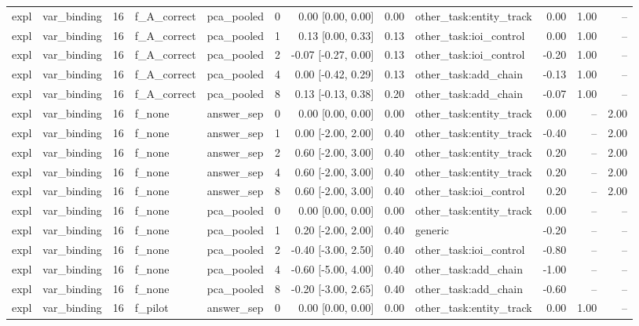 \begin{tabular}{llrllrrrlrrr}
expl & var\_binding & 16 & f\_A\_correct & pca\_pooled & 0 & 0.00 [0.00, 0.00] & 0.00 & other\_task:entity\_track & 0.00 & 1.00 & -- \\
expl & var\_binding & 16 & f\_A\_correct & pca\_pooled & 1 & 0.13 [0.00, 0.33] & 0.13 & other\_task:ioi\_control & 0.00 & 1.00 & -- \\
expl & var\_binding & 16 & f\_A\_correct & pca\_pooled & 2 & -0.07 [-0.27, 0.00] & 0.13 & other\_task:ioi\_control & -0.20 & 1.00 & -- \\
expl & var\_binding & 16 & f\_A\_correct & pca\_pooled & 4 & 0.00 [-0.42, 0.29] & 0.13 & other\_task:add\_chain & -0.13 & 1.00 & -- \\
expl & var\_binding & 16 & f\_A\_correct & pca\_pooled & 8 & 0.13 [-0.13, 0.38] & 0.20 & other\_task:add\_chain & -0.07 & 1.00 & -- \\
expl & var\_binding & 16 & f\_none & answer\_sep & 0 & 0.00 [0.00, 0.00] & 0.00 & other\_task:entity\_track & 0.00 & -- & 2.00 \\
expl & var\_binding & 16 & f\_none & answer\_sep & 1 & 0.00 [-2.00, 2.00] & 0.40 & other\_task:entity\_track & -0.40 & -- & 2.00 \\
expl & var\_binding & 16 & f\_none & answer\_sep & 2 & 0.60 [-2.00, 3.00] & 0.40 & other\_task:entity\_track & 0.20 & -- & 2.00 \\
expl & var\_binding & 16 & f\_none & answer\_sep & 4 & 0.60 [-2.00, 3.00] & 0.40 & other\_task:entity\_track & 0.20 & -- & 2.00 \\
expl & var\_binding & 16 & f\_none & answer\_sep & 8 & 0.60 [-2.00, 3.00] & 0.40 & other\_task:ioi\_control & 0.20 & -- & 2.00 \\
expl & var\_binding & 16 & f\_none & pca\_pooled & 0 & 0.00 [0.00, 0.00] & 0.00 & other\_task:entity\_track & 0.00 & -- & -- \\
expl & var\_binding & 16 & f\_none & pca\_pooled & 1 & 0.20 [-2.00, 2.00] & 0.40 & generic & -0.20 & -- & -- \\
expl & var\_binding & 16 & f\_none & pca\_pooled & 2 & -0.40 [-3.00, 2.50] & 0.40 & other\_task:ioi\_control & -0.80 & -- & -- \\
expl & var\_binding & 16 & f\_none & pca\_pooled & 4 & -0.60 [-5.00, 4.00] & 0.40 & other\_task:add\_chain & -1.00 & -- & -- \\
expl & var\_binding & 16 & f\_none & pca\_pooled & 8 & -0.20 [-3.00, 2.65] & 0.40 & other\_task:add\_chain & -0.60 & -- & -- \\
expl & var\_binding & 16 & f\_pilot & answer\_sep & 0 & 0.00 [0.00, 0.00] & 0.00 & other\_task:entity\_track & 0.00 & 1.00 & -- \\

\end{tabular}
